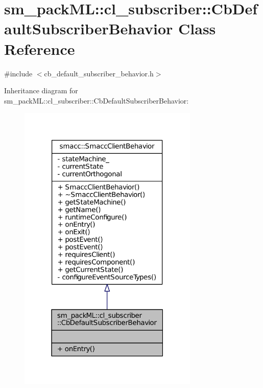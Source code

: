 \hypertarget{classsm__packML_1_1cl__subscriber_1_1CbDefaultSubscriberBehavior}{}\section{sm\+\_\+pack\+ML\+:\+:cl\+\_\+subscriber\+:\+:Cb\+Default\+Subscriber\+Behavior Class Reference}
\label{classsm__packML_1_1cl__subscriber_1_1CbDefaultSubscriberBehavior}


{\ttfamily \#include $<$cb\+\_\+default\+\_\+subscriber\+\_\+behavior.\+h$>$}



Inheritance diagram for sm\+\_\+pack\+ML\+:\+:cl\+\_\+subscriber\+:\+:Cb\+Default\+Subscriber\+Behavior\+:
\nopagebreak
\begin{figure}[H]
\begin{center}
\leavevmode
\includegraphics[width=243pt]{classsm__packML_1_1cl__subscriber_1_1CbDefaultSubscriberBehavior__inherit__graph}
\end{center}
\end{figure}


